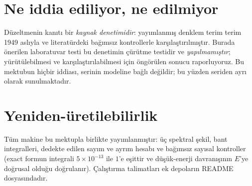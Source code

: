 \documentclass[letter]{aa}
\begin{document}
\section{Ne iddia ediliyor, ne edilmiyor}
Düzeltmenin kanıtı bir \emph{kaynak denetimidir}: yayımlanmış denklem
terim terim 1949 aslıyla ve literatürdeki bağımsız kontrollerle
karşılaştırılmıştır. Burada önerilen laboratuvar testi bu denetimin
çürütme testidir ve \emph{yapılmamıştır}; yürütülebilmesi ve
karşılaştırılabilmesi için öngörülen sonucu raporluyoruz. Bu mektubun
hiçbir iddiası, serinin modeline bağlı değildir; bu yüzden seriden ayrı
olarak sunulmaktadır.

\section{Yeniden-üretilebilirlik}
Tüm makine bu mektupla birlikte yayımlanmıştır: üç spektral şekil, bant
integralleri, dedekte edilen sayım ve ayrım hesabı ve bağımsız sayısal
kontroller (exact formun integrali $5\times10^{-13}$ ile $1$'e eşittir ve
düşük-enerji davranışının $E$'ye doğrusal olduğu doğrulanır).
Çalıştırma talimatları ek depoların README dosyasındadır.

\nocite{ps95}



\end{document}
